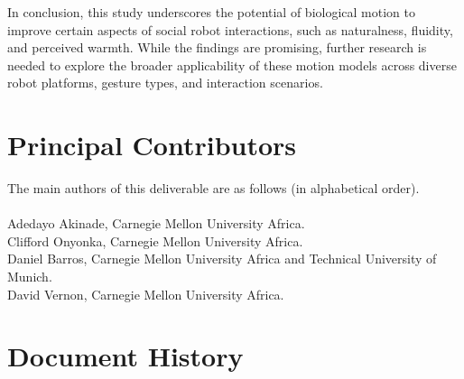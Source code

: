 \documentclass{CSSRforAfrica}
\newcommand{\blank}{~\\}
\begin{document}
In conclusion, this study underscores the potential of biological motion to improve certain aspects of social robot interactions, such as naturalness, fluidity, and perceived warmth. While the findings are promising, further research is needed to explore the broader applicability of these motion models across diverse robot platforms, gesture types, and interaction scenarios.



               

 

\pagebreak
\section*{Principal Contributors}
\label{contributors}
The main authors of this deliverable are as follows (in alphabetical order).
\blank
~
\blank
Adedayo Akinade, Carnegie Mellon University Africa.\\
Clifford Onyonka, Carnegie Mellon University Africa.\\
Daniel Barros, Carnegie Mellon University Africa and Technical University of Munich. \\
David Vernon, Carnegie Mellon University Africa.\\   
  

\newpage
\section*{Document History}
\label{document_history}
\end{document}
